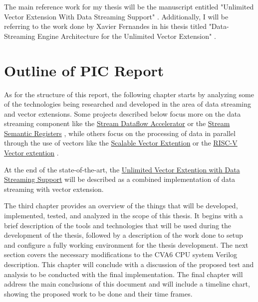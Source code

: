 The main reference work for my thesis will be the manuscript entitled "Unlimited Vector Extension With Data Streaming Support" \cite{uve-paper}. Additionally, I will be referring to the work done by Xavier Fernandes in his thesis titled "Data-Streaming Engine Architecture for the Unlimited Vector Extension" \cite{thesis-xf}.

\section{Outline of PIC Report}

As for the structure of this report, the following chapter starts by analyzing some of the technologies being researched and developed in the area of data streaming and vector extensions. Some projects described below focus more on the data streaming component like the \hyperref[label:stream_dataflow]{Stream Dataflow Accelerator} \cite{8192490} or the \hyperref[label:ssr]{Stream Semantic Registers} \cite{9068465}, while others focus on the processing of data in parallel through the use of vectors like the \hyperref[label:arm-sve]{Scalable Vector Extention} \cite{arm-paper} or the \hyperref[label:rvv]{RISC-V Vector extention} \cite{RVV}. 

At the end of the state-of-the-art, the \hyperref[label:uve]{Unlimited Vector Extention with Data Streaming Support} will be described as a combined implementation of data streaming with vector extension. 

The third chapter provides an overview of the things that will be developed, implemented, tested, and analyzed in the scope of this thesis. It begins with a brief description of the tools and technologies that will be used during the development of the thesis, followed by a description of the work done to setup and configure a fully working environment for the thesis development. The next section covers the necessary modifications to the CVA6 CPU system Verilog description. This chapter will conclude with a discussion of the proposed test and analysis to be conducted with the final implementation.
The final chapter will address the main conclusions of this document and will include a timeline chart, showing the proposed work to be done and their time frames.